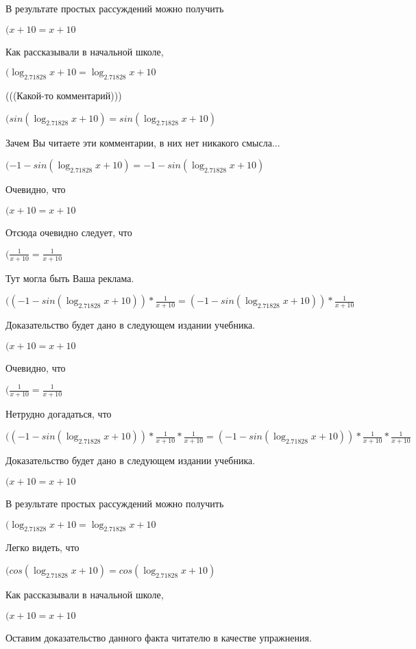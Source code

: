 \documentclass[12pt,a4paper,fleqn]{article}
\theoremstyle{definition}
\begin{document}
В результате простых рассуждений можно получить

$( x  +  10  =  x  +  10 $

Как рассказывали в начальной школе,

$(\log_{ 2.71828 }{ x  +  10 } = \log_{ 2.71828 }{ x  +  10 }$

(((Какой-то комментарий)))

$(sin(\log_{ 2.71828 }{ x  +  10 }) = sin(\log_{ 2.71828 }{ x  +  10 })$

Зачем Вы читаете эти комментарии, в них нет никакого смысла...

$( -1  - sin(\log_{ 2.71828 }{ x  +  10 }) =  -1  - sin(\log_{ 2.71828 }{ x  +  10 })$

Очевидно, что

$( x  +  10  =  x  +  10 $

Отсюда очевидно следует, что

$(\frac{ 1 }{ x  +  10 }
 = \frac{ 1 }{ x  +  10 }
$

Тут могла быть Ваша реклама.

$(( -1  - sin(\log_{ 2.71828 }{ x  +  10 })) * \frac{ 1 }{ x  +  10 }
 = ( -1  - sin(\log_{ 2.71828 }{ x  +  10 })) * \frac{ 1 }{ x  +  10 }
$

Доказательство будет дано в следующем издании учебника.

$( x  +  10  =  x  +  10 $

Очевидно, что

$(\frac{ 1 }{ x  +  10 }
 = \frac{ 1 }{ x  +  10 }
$

Нетрудно догадаться, что

$(( -1  - sin(\log_{ 2.71828 }{ x  +  10 })) * \frac{ 1 }{ x  +  10 }
 * \frac{ 1 }{ x  +  10 }
 = ( -1  - sin(\log_{ 2.71828 }{ x  +  10 })) * \frac{ 1 }{ x  +  10 }
 * \frac{ 1 }{ x  +  10 }
$

Доказательство будет дано в следующем издании учебника.

$( x  +  10  =  x  +  10 $

В результате простых рассуждений можно получить

$(\log_{ 2.71828 }{ x  +  10 } = \log_{ 2.71828 }{ x  +  10 }$

Легко видеть, что

$(cos(\log_{ 2.71828 }{ x  +  10 }) = cos(\log_{ 2.71828 }{ x  +  10 })$

Как рассказывали в начальной школе,

$( x  +  10  =  x  +  10 $

Оставим доказательство данного факта читателю в качестве упражнения.
\end{document}

